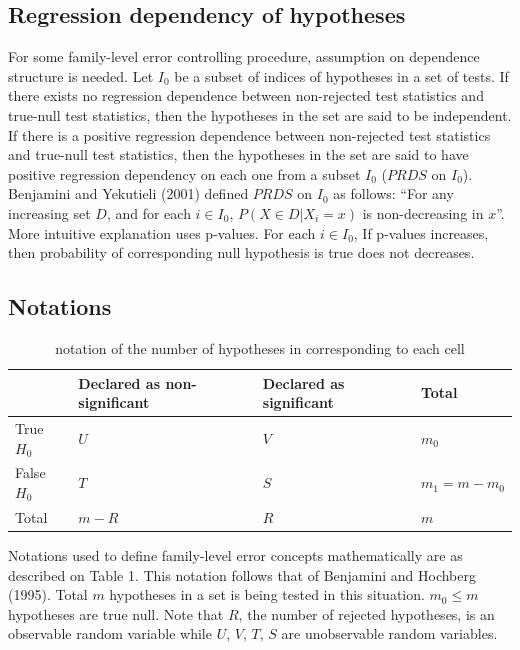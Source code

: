 \documentclass[a4paper, 11pt, oneside]{article}
\begin{document}
\subsection{Regression dependency of hypotheses}
For some family-level error controlling procedure, assumption on dependence structure is needed. Let $I_0$ be a subset of indices of hypotheses in a set of tests. If there exists no regression dependence between non-rejected test statistics and true-null test statistics, then the hypotheses in the set are said to be independent. If there is a positive regression dependence between non-rejected test statistics and true-null test statistics, then the hypotheses in the set are said to have positive regression dependency on each one from a subset $I_0$ ($PRDS$ on $I_0$). Benjamini and Yekutieli (2001) defined $PRDS$ on $I_0$ as follows: \enquote{For any increasing set $D$, and for each $i \in I_0$, $P(X \in D | X_i = x)$ is non-decreasing in $x$}. More intuitive explanation uses p-values. For each $i \in I_0$, If p-values increases, then probability of corresponding null hypothesis is true does not decreases.

\subsection{Notations}
\begin{table}[ht]
    \small
    \setlength{\tabcolsep}{3pt}
\centering
\begin{tabularx}{.7\hsize}{@{}l LLL@{}}
    \toprule
 & Declared as non-significant  & Declared as significant & Total \\
    \midrule
True $H_0$ 
    & $U$ 
        & $V$ 
            & $m_0$ \\
False $H_0$ 
    & $T$ 
        & $S$
            &  $m_1=m-m_0$ \\
Total & $m-R$ 
        & $R$ 
            & $m$ \\
    \bottomrule
\end{tabularx}
\caption{notation of the number of hypotheses in corresponding to each cell}
    \end{table}

Notations used to define family-level error concepts mathematically are as described on Table 1. This notation follows that of Benjamini and Hochberg (1995). Total $m$ hypotheses in a set is being tested in this situation. $m_0 \leq m$ hypotheses are true null. Note that $R$, the number of rejected hypotheses, is an observable random variable while $U$, $V$, $T$, $S$ are unobservable random variables.
\vspace{0.2in}
\end{document}
